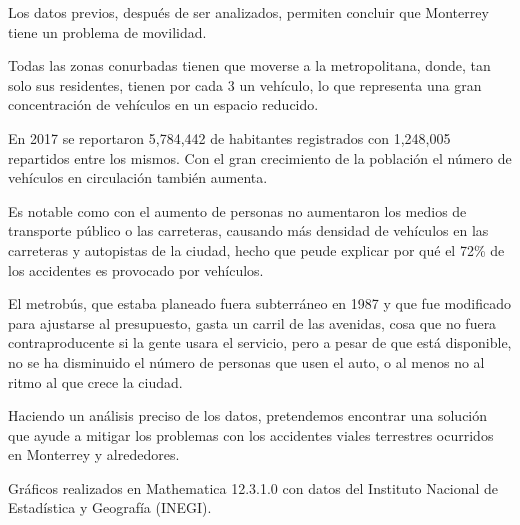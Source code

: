 \documentclass[a4paper]{article}
\begin{document}
Los datos previos, después de ser analizados, permiten concluir que Monterrey tiene un problema de movilidad.

Todas las zonas conurbadas tienen que moverse a la metropolitana,  donde, tan solo sus residentes, tienen por cada 3 un vehículo, lo que representa una gran concentración de vehículos en un espacio reducido.

En 2017 se reportaron 5,784,442 de habitantes registrados con 1,248,005 repartidos entre los mismos. Con el gran crecimiento de la población el número de vehículos en circulación también aumenta. 

Es notable como con el aumento de personas no aumentaron los medios de transporte público o las carreteras, causando más densidad de vehículos en las carreteras y autopistas de la ciudad, hecho que peude explicar por qué el 72\% de los accidentes es provocado por vehículos.

El metrobús, que estaba planeado fuera subterráneo en 1987 y que fue modificado para ajustarse al presupuesto, gasta un carril de las avenidas, cosa que no fuera contraproducente si la gente usara el servicio, pero a pesar de que está disponible, no se ha disminuido el número de personas que usen el auto, o al menos no al ritmo al que crece la ciudad. 

Haciendo un análisis preciso de los datos, pretendemos encontrar una solución que ayude a mitigar los problemas con los accidentes viales terrestres ocurridos en Monterrey y alrededores.


\printbibliography

Gráficos realizados en Mathematica 12.3.1.0 con datos del Instituto Nacional de Estadística y Geografía (INEGI).
\end{document}
